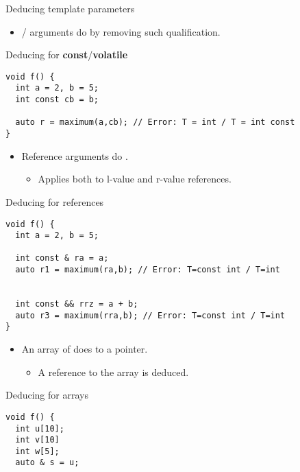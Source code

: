 \begin{frame}{Deducing template parameters}

\begin{itemize}
  \item {}/ arguments do  
        by removing such qualification.
\end{itemize}

\begin{block}{Deducing for \textbf{const}/\textbf{volatile}}
\begin{lstlisting}
void f() {
  int a = 2, b = 5;
  int const cb = b;

  auto r = maximum(a,cb); // Error: T = int / T = int const
}
\end{lstlisting}
\end{block}

\framebreak

\begin{itemize}
  \item Reference arguments do  .
    \begin{itemize}
      \item Applies both to l-value and r-value references.
    \end{itemize}
\end{itemize}

\begin{block}{Deducing for references}
\begin{lstlisting}
void f() {
  int a = 2, b = 5;

  int const & ra = a;
  auto r1 = maximum(ra,b); // Error: T=const int / T=int


  int const && rrz = a + b;
  auto r3 = maximum(rra,b); // Error: T=const int / T=int
}

\end{lstlisting}
\end{block}

\framebreak

\begin{itemize}
  \item An array of  does   to a pointer.
    \begin{itemize}
      \item A reference to the array is deduced.
    \end{itemize}
\end{itemize}

\begin{block}{Deducing for arrays}
\begin{lstlisting}
void f() {
  int u[10];
  int v[10]
  int w[5];
  auto & s = u;


\end{lstlisting}
\end{block}
\end{frame}
